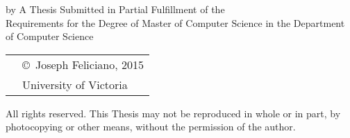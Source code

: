 \pagebreak
{
\centering
\thesistitle
\tpbreak
by
\tpbreak
\nameanddegrees
\vspace{3cm}
A Thesis Submitted in Partial Fulfillment of the \\
Requirements for the Degree of
\tpbreak
Master of Computer Science
\tpbreak
in the Department of Computer Science\\
\vfill
\begin{tabular}{cl}
& \copyright\ Joseph Feliciano, 2015\\
& \phantom{\copyright} University of Victoria
\end{tabular}
\tpbreak
All rights reserved. This Thesis may not be reproduced in whole or in part, by \\
\hfill photocopying or other means, without the permission of the author.
\hfill
}
\pagebreak
